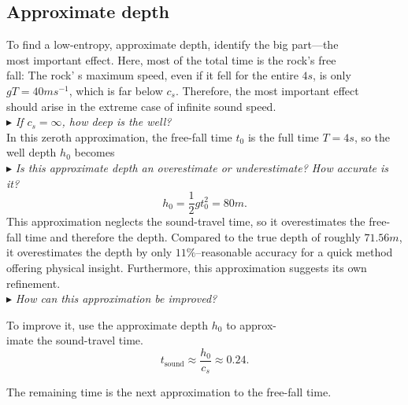 \documentclass{book}
\begin{document}
\subsection{\Large Approximate depth}

\Large To find a low-entropy, approximate depth, identify the big part---the\\
most important effect. Here, most of the total time is the rock's free\\
fall: The rock' s maximum speed, even if it fell for the entire $4 s$, is only\\
$gT = 40ms^{-1}$, which is far below $c_s$. Therefore, the most important effect\\
should arise in the extreme case of infinite sound speed.\\[6pt]
 $\blacktriangleright$ \textit{If $c_s = \infty$, how deep is the well?}\\[6pt]
\Large In this zeroth approximation, the free-fall time $t_0$ is the full time $T = 4 s$,
so the well depth $h_0$ becomes\\[6pt]
 $\blacktriangleright$ \textit{Is this approximate depth an overestimate or underestimate? How accurate is it?}\\[6pt]
\begin{equation}
{h_0=\frac1{2}g{t^2_0}=80m}.
\end{equation}
\Large This approximation neglects the sound-travel time, so it overestimates
the free-fall time and therefore the depth. Compared to the true depth
of roughly $71.56 m$, it overestimates the depth by only $11\%$--reasonable
accuracy for a quick method offering physical insight. Furthermore, this
approximation suggests its own refinement.\\[6pt]
 $\blacktriangleright$ \textit{How can this approximation be improved?}\\[6pt]
\begin{minipage}{\textwidth}
\Large To improve it, use the approximate depth $h_0$ to approx-\\
imate the sound-travel time.\\
\begin{equation}
{t_{\textrm{sound}}\approx \frac{h_0}{c_s}\approx 0.24}.
\end{equation}
\end{minipage}
\Large The remaining time is the next approximation to the free-fall time.
\end{document}
